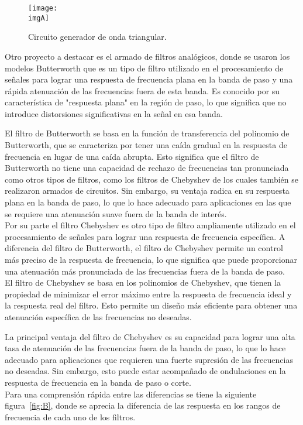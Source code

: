 \documentclass[a4paper,12pt]{article}
\newcommand{\imgA}{img/imagen1.jpg}
\begin{document}
        \begin{figure}[H] 
            \centering 
            \texttt{[image: \\imgA]} 
            \caption{Circuito generador de onda triangular.} 
            \label{fig:A} 
        \end{figure} 

        Otro proyecto a destacar es el armado de filtros analógicos, donde se usaron los modelos Butterworth que es un tipo de filtro utilizado en el procesamiento de señales para lograr una respuesta de frecuencia plana en la banda de paso y una rápida atenuación de las frecuencias fuera de esta banda. Es conocido por su característica de "respuesta plana" en la región de paso, lo que significa que no introduce distorsiones significativas en la señal en esa banda.

        El filtro de Butterworth se basa en la función de transferencia del polinomio de Butterworth, que se caracteriza por tener una caída gradual en la respuesta de frecuencia en lugar de una caída abrupta. Esto significa que el filtro de Butterworth no tiene una capacidad de rechazo de frecuencias tan pronunciada como otros tipos de filtros, como los filtros de Chebyshev de los cuales también se realizaron armados de circuitos. Sin embargo, su ventaja radica en su respuesta plana en la banda de paso, lo que lo hace adecuado para aplicaciones en las que se requiere una atenuación suave fuera de la banda de interés.\\
        Por su parte el filtro Chebyshev es otro tipo de filtro ampliamente utilizado en el procesamiento de señales para lograr una respuesta de frecuencia específica. A diferencia del filtro de Butterworth, el filtro de Chebyshev permite un control más preciso de la respuesta de frecuencia, lo que significa que puede proporcionar una atenuación más pronunciada de las frecuencias fuera de la banda de paso.\\
        El filtro de Chebyshev se basa en los polinomios de Chebyshev, que tienen la propiedad de minimizar el error máximo entre la respuesta de frecuencia ideal y la respuesta real del filtro. Esto permite un diseño más eficiente para obtener una atenuación específica de las frecuencias no deseadas.

        La principal ventaja del filtro de Chebyshev es su capacidad para lograr una alta tasa de atenuación de las frecuencias fuera de la banda de paso, lo que lo hace adecuado para aplicaciones que requieren una fuerte supresión de las frecuencias no deseadas. Sin embargo, esto puede estar acompañado de ondulaciones en la respuesta de frecuencia en la banda de paso o corte.\\
        Para una comprensión rápida entre las diferencias se tiene la siguiente figura~\ref{fig:B}, donde se aprecia la diferencia de las respuesta en los rangos de frecuencia de cada uno de los filtros. 
\end{document}
